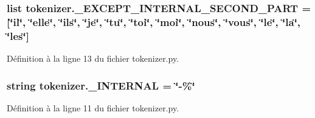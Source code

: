 \subsubsection[{\+\_\+\+E\+X\+C\+E\+P\+T\+\_\+\+I\+N\+T\+E\+R\+N\+A\+L\+\_\+\+S\+E\+C\+O\+N\+D\+\_\+\+P\+A\+R\+T}]{\setlength{\rightskip}{0pt plus 5cm}list tokenizer.\+\_\+\+E\+X\+C\+E\+P\+T\+\_\+\+I\+N\+T\+E\+R\+N\+A\+L\+\_\+\+S\+E\+C\+O\+N\+D\+\_\+\+P\+A\+R\+T = \mbox{[}\char`\"{}il\char`\"{}, \char`\"{}elle\char`\"{}, \char`\"{}ils\char`\"{}, \char`\"{}je\char`\"{}, \char`\"{}tu\char`\"{}, \char`\"{}toi\char`\"{}, \char`\"{}moi\char`\"{}, \char`\"{}nous\char`\"{}, \char`\"{}vous\char`\"{}, \char`\"{}le\char`\"{}, \char`\"{}la\char`\"{}, \char`\"{}les\char`\"{}\mbox{]}}\label{namespacetokenizer_aa94519b0cea3d01e281f543a1d2a4d2f}


Définition à la ligne 13 du fichier tokenizer.\+py.

\hypertarget{namespacetokenizer_a5c2d26110082282c1eb766a0a71dfc9d}{}
\subsubsection[{\+\_\+\+I\+N\+T\+E\+R\+N\+A\+L}]{\setlength{\rightskip}{0pt plus 5cm}string tokenizer.\+\_\+\+I\+N\+T\+E\+R\+N\+A\+L = \char`\"{}-\/\%\char`\"{}}\label{namespacetokenizer_a5c2d26110082282c1eb766a0a71dfc9d}


Définition à la ligne 11 du fichier tokenizer.\+py.

